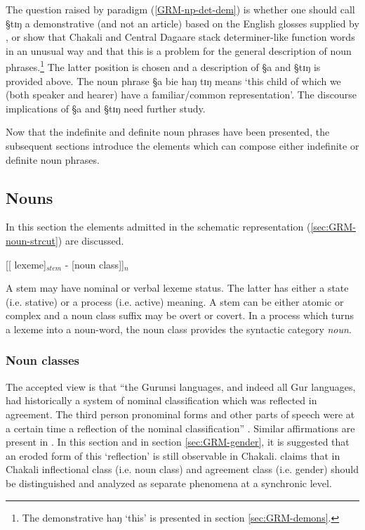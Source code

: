 The question raised by paradigm  (\ref{GRM-np-det-dem}) is  whether one
should call {\S tɪŋ} a demonstrative (and not an article) based  on the English
glosses  supplied by  \citet[47]{Bodo97}, or show that Chakali and Central
Dagaare stack determiner-like function words in an unusual way and that this is
a problem for the general description of noun phrases.\footnote{The
demonstrative {\F haŋ} `this' is presented in section \ref {sec:GRM-demons}.}
The latter position is
chosen and a description of  {\S a} and {\S tɪŋ} is provided above. The
noun phrase {\S a bie haŋ tɪŋ} means `this child of which we (both speaker and
hearer)   have a familiar/common representation'.  The discourse implications
 of  {\S a} and  {\S tɪŋ}  need 
further study. 

Now that the indefinite and definite noun phrases have been presented, the
subsequent sections introduce the elements which can compose  either  indefinite
or  definite noun  phrases.




\subsection{Nouns}
\label{sec:GRM-noun}

In this section the elements admitted in the
schematic representation (\ref{sec:GRM-noun-strcut}) are discussed.

\begin{exe}
\ex\label{sec:GRM-noun-strcut}
[[ {\sc lexeme}]$_{stem}$ - [{\sc noun class}]]$_{n}$
\end{exe}

A stem may have 
nominal or verbal lexeme status. The latter has either a state (i.e. stative) or
a process (i.e. active) meaning.  A stem can be either atomic or complex and a
noun class suffix may be overt or covert.  In a
 process which turns a lexeme into a noun-word,  the noun class provides the
syntactic category {\it noun}. 




\subsubsection{Noun classes}
\label{sec:GRM-noun-classes}

The accepted view is that ``the Gurunsi languages, and indeed all Gur languages,
had historically a system of nominal classification which was reflected in
agreement. The third person pronominal forms and other parts of speech were at a
certain time a reflection of the nominal classification''  \citep{Nade89}.
 Similar affirmations are present in \cite{Mane69b, Waa71, Nade82, Nade98,
Tcha07}.  In this section and in section
\ref{sec:GRM-gender}, it is suggested that
an eroded form of this `reflection' is still observable in Chakali.
\cite{Brin07c} claims that in Chakali inflectional class
(i.e. noun class) and agreement class (i.e. gender) should be distinguished and
analyzed as separate phenomena at a synchronic level.

